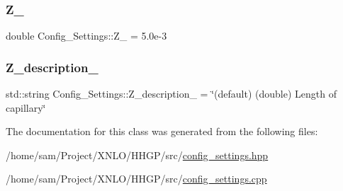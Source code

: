 \mbox{\label{class_config___settings_a32281faced0dc663ce2b0a4dc6dd25a7}} 
\subsubsection{\texorpdfstring{Z\+\_\+}{Z\_}}
{\footnotesize\ttfamily double Config\+\_\+\+Settings\+::\+Z\+\_\+ = 5.\+0e-\/3\hspace{0.3cm}{\ttfamily [private]}}

\mbox{\label{class_config___settings_a50cd3c7bc111833774726cd688e3a52b}} 
\subsubsection{\texorpdfstring{Z\+\_\+description\+\_\+}{Z\_description\_}}
{\footnotesize\ttfamily std\+::string Config\+\_\+\+Settings\+::\+Z\+\_\+description\+\_\+ = \char`\"{}(default) (double) Length of capillary\char`\"{}\hspace{0.3cm}{\ttfamily [private]}}



The documentation for this class was generated from the following files\+:\begin{DoxyCompactItemize}
\item 
/home/sam/\+Project/\+X\+N\+L\+O/\+H\+H\+G\+P/src/\hyperlink{config__settings_8hpp}{config\+\_\+settings.\+hpp}\item 
/home/sam/\+Project/\+X\+N\+L\+O/\+H\+H\+G\+P/src/\hyperlink{config__settings_8cpp}{config\+\_\+settings.\+cpp}\end{DoxyCompactItemize}
